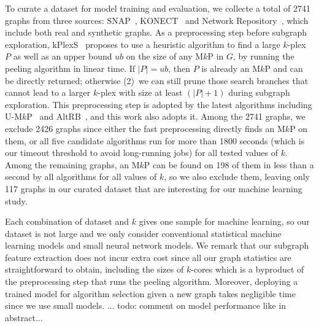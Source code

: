 \documentclass[sigconf,anonymous,review]{acmart}
\begin{document}
To curate a dataset for model training and evaluation, we collecte a total of 2741 graphs from three sources: SNAP~\cite{SNAP}, KONECT~\cite{KONECT} and Network Repository~\cite{NetworkRepository}, which include both real and synthetic graphs. As a preprocessing step before subgraph exploration, kPlexS~\cite{kPlexS} proposes to use a heuristic algorithm to find a large $k$-plex $P$ as well as an upper bound $ub$ on the size of any M$k$P in $G$, by running the peeling algorithm in linear time. If $|P|=ub$, then $P$ is already an M$k$P and can be directly returned; otherwise (2)~we can still prune those search branches that cannot lead to a larger $k$-plex with size at least $(|P|+1)$ during subgraph exploration. This preprocessing step is adopted by the latest algorithms including U-M$k$P~\cite{akhlaque_vldb} and AltRB~\cite{clong_vldb}, and this work also adopts it. Among the 2741 graphs, {\color{red} we exclude 2426 graphs since either the fast preprocessing directly finds an M$k$P on them, or all five candidate algorithms run for more than 1800 seconds (which is our timeout threshold to avoid long-running jobs) for all tested values of $k$.} %
%
Among the remaining graphs, an M$k$P can be found on 198 of them in less than a second by all algorithms for all values of $k$, so we also exclude them, leaving only 117 graphs in our curated dataset that are interesting for our machine learning study.

Each combination of dataset and $k$ gives one sample for machine learning, so our dataset is not large and we only consider conventional statistical machine learning models and small neural network models. We remark that our subgraph feature extraction does not incur extra cost since all our graph statistics are straightforward to obtain, including the sizes of $k$-cores which is a byproduct of the preprocessing step that runs the peeling algorithm. Moreover, deploying a trained model for algorithm selection given a new graph takes negligible time since we use small models. 
%
{\color{red}... todo: comment on model performance like in abstract...}
\end{document}
